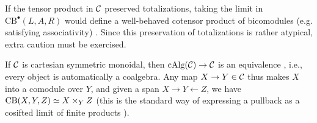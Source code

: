 \documentclass{amsart}
\numberwithin{proposition}{section}
\numberwithin{equation}{section}
\newcommand{\CB}{\mathrm{CB}}
\begin{document}
\begin{remark}
If the tensor product in $\mathcal C$ preserved totalizations, taking the limit in $\CB^\bullet(L, A, R)$ would define a well-behaved cotensor product of bicomodules (e.g. satisfying associativity) \cite[Theorem~4.4.2.8]{lurie-ha}.
Since this preservation of totalizations is rather atypical, extra caution must be exercised.
\end{remark}

\begin{example}
If $\mathcal C$ is cartesian symmetric monoidal, then $\mathrm{cAlg}(\mathcal C) \to \mathcal C$ is an equivalence \cite[Corollary~2.4.3.10]{lurie-ha}, i.e., every object is automatically a coalgebra.
Any map $X \to Y \in \mathcal C$ thus makes $X$ into a comodule over $Y$, and given a span $X \to Y \leftarrow Z$, we have $\CB(X, Y, Z) \wequi X \times_Y Z$ (this is the standard way of expressing a pullback as a cosifted limit of finite products \cite[Theorem~4.4.2.8]{lurie-ha}).
\end{example}
\end{document}
